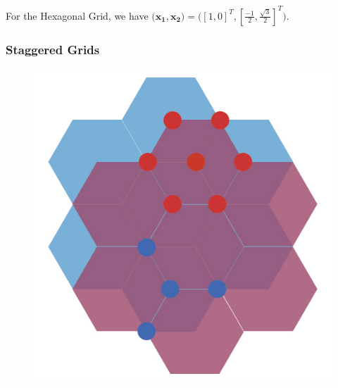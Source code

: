 \documentclass{beamer}
\begin{document}
\begin{frame}
\begin{figure}
\end{figure}

For the Hexagonal Grid, we have $\big( \mathbf{x_1}, \mathbf{x_2} \big) = \big([1,0]^T, [\frac{-1}{2},\frac{\sqrt{3}}{2}]^T \big)$.

\end{frame}


\begin{frame}
\frametitle{Staggered Grids}

\begin{figure}
\centering
\begin{minipage}{.5\textwidth}
  \centering
\includegraphics[scale=0.2]{./images/jpgStaggeredColocated.jpg}
\label{fig:StaggeredColocated}
\end{minipage}%
\begin{minipage}{.5\textwidth}
  \centering

\end{minipage}
\end{figure}
\end{frame}
\end{document}
